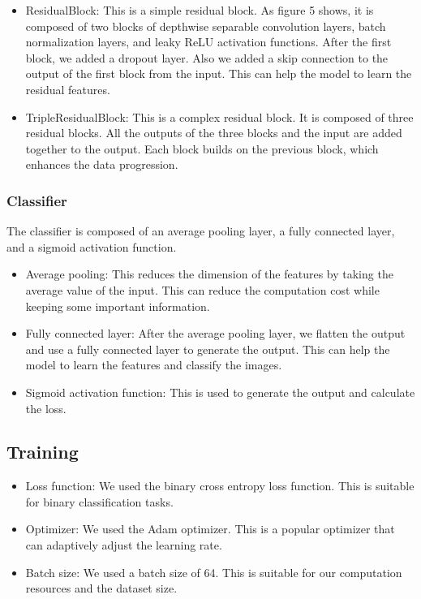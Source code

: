 \documentclass[12pt]{article}
\begin{document}
\begin{itemize}
    \item ResidualBlock: This is a simple residual block. As figure 5 shows, it is composed of two blocks of depthwise separable convolution layers, batch normalization layers, and leaky ReLU activation functions. After the first block, we added a dropout layer. Also we added a skip connection to the output of the first block from the input. This can help the model to learn the residual features.
    \item TripleResidualBlock: This is a complex residual block. It is composed of three residual blocks. All the outputs of the three blocks and the input are added together to the output. Each block builds on the previous block, which enhances the data progression.
\end{itemize}

\subsubsection{Classifier}

The classifier is composed of an average pooling layer, a fully connected layer, and a sigmoid activation function.

\begin{itemize}
    \item Average pooling: This reduces the dimension of the features by taking the average value of the input. This can reduce the computation cost while keeping some important information.
    \item Fully connected layer: After the average pooling layer, we flatten the output and use a fully connected layer to generate the output. This can help the model to learn the features and classify the images.
    \item Sigmoid activation function: This is used to generate the output and calculate the loss.
\end{itemize}

\subsection{Training}

\begin{itemize}
    \item Loss function: We used the binary cross entropy loss function. This is suitable for binary classification tasks.
    \item Optimizer: We used the Adam optimizer. This is a popular optimizer that can adaptively adjust the learning rate.
    \item Batch size: We used a batch size of 64. This is suitable for our computation resources and the dataset size.
\end{itemize}
\end{document}
